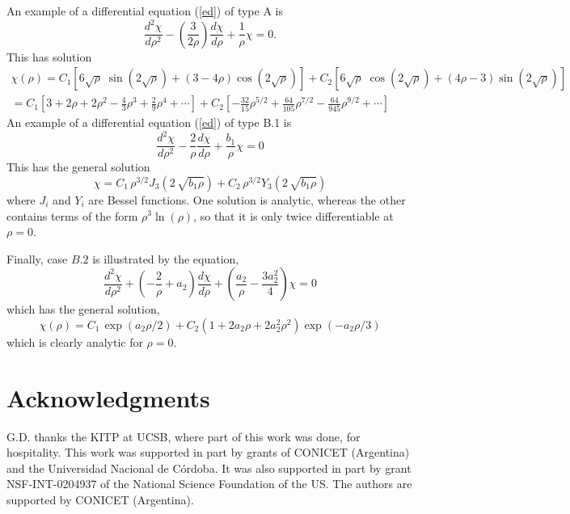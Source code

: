 \documentclass[12pt,aps,floats,showpacs,amssymb,tightenlines]{revtex4}
\begin{document}
An example of a differential equation (\ref{ed}) of type A is
\begin{equation}
\frac {d^2\chi}{d\rho^2} -  \left(\frac {3}{2 \rho} \right)\frac {d
\chi}{d\rho} +\frac {1}{\rho}\chi = 0.
\end{equation}
This has solution
\begin{multline}
\chi(\rho) = C_1 \left[ 6 \sqrt{\rho}\; \sin(2 \sqrt{\rho} ) + (3-4
\rho) \cos(2 \sqrt{\rho} ) \right]  + C_2 \left[ 6 \sqrt{\rho}\;
\cos(2 \sqrt{\rho} ) + (4 \rho -3) \sin(2 \sqrt{\rho} ) \right] \\ =
C_1 \left[ 3 + 2 \rho + 2 \rho^2 -\frac{4}{3} \rho^3 + \frac{2}{9}
\rho^4 + \cdots  \right] + C_2 \left[ -\frac{32}{15} \rho^{5/2} +
\frac{64}{105} \rho^{7/2} - \frac{64}{945} \rho^{9/2} + \cdots
\right]
\end{multline}
An example of a differential equation (\ref{ed}) of type B.1 is
\begin{equation}
\label{app1a} \frac {d^2\chi}{d\rho^2} -\frac{2}  {\rho}\frac {d
\chi}{d\rho} +\frac {b_1}{\rho}\chi = 0
\end{equation}
This has the general solution
\begin{equation}
\label{app1b} \chi  ={C_1}\,{\rho}^{3/2}{J_3}
 \left( 2\,\sqrt { b_1 \rho} \right) +{C_2}\,{\rho}^{3/2}{
Y_3} \left( 2\,\sqrt { b_1 \rho} \right)
\end{equation}
where $J_i$ and $Y_i$ are Bessel functions. One solution is
analytic, whereas the other contains  terms
 of the form $\rho^3 \ln(\rho)$, so that it is only twice differentiable at $\rho=0$.

Finally, case $B.2$ is illustrated by the equation,
\begin{equation}
\label{app6}
\frac {d^2\chi}{d\rho^2}
+\left(-\frac{2}  {\rho}+a_2\right)\frac {d \chi}{d\rho}
+\left(\frac {a_2}{\rho}- \frac{3 a_2^2}{4}\right)\chi = 0
\end{equation}
which has the general solution,
\begin{equation}
\label{app6a}
 \chi(\rho) ={ C_1}\,\exp(a_2 \rho/2)+{
C_2}  \left( 1+2 a_2\rho+2 a_2^{
2}{\rho}^{2} \right) \exp(-a_2 \rho/3)
\end{equation}
which is clearly analytic for $\rho=0$.


\section*{Acknowledgments}
 G.D. thanks the KITP at UCSB, where part of this work was done,
 for  hospitality.
This work was supported in part by grants of CONICET (Argentina) and
the Universidad Nacional de   C\'ordoba. It was also supported in
part by grant NSF-INT-0204937 of the National Science Foundation of
the US. The authors are supported by CONICET (Argentina).
\end{document}
